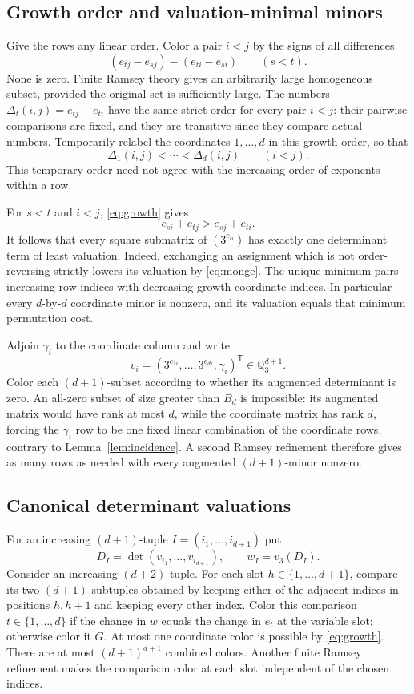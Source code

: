 \documentclass[11pt]{article}
\theoremstyle{definition}
\theoremstyle{remark}
\newcommand{\Q}{\mathbb Q}
\newcommand{\val}{v_3}
\begin{document}
\subsection{Growth order and valuation-minimal minors}
Give the rows any linear order. Color a pair $i<j$ by the signs of all
differences
\[
 (e_{tj}-e_{sj})-(e_{ti}-e_{si})\qquad(s<t).
\]
None is zero. Finite Ramsey theory gives an arbitrarily large
homogeneous subset, provided the original set is sufficiently large.
The numbers
$\Delta_t(i,j)=e_{tj}-e_{ti}$ have the same strict order for every
pair $i<j$: their pairwise comparisons are fixed, and they are
transitive since they compare actual numbers. Temporarily relabel the
coordinates $1,\ldots,d$ in this growth order, so that
\begin{equation}\label{eq:growth}
 \Delta_1(i,j)<\cdots<\Delta_d(i,j)\qquad(i<j).
\end{equation}
This temporary order need not agree with the increasing order of
exponents within a row.

For $s<t$ and $i<j$, \eqref{eq:growth} gives
\begin{equation}\label{eq:monge}
 e_{si}+e_{tj}>e_{sj}+e_{ti}.
\end{equation}
It follows that every square submatrix of $(3^{e_{ti}})$ has exactly
one determinant term of least valuation. Indeed, exchanging an
assignment which is not order-reversing strictly lowers its valuation
by \eqref{eq:monge}. The unique minimum pairs increasing row indices
with decreasing growth-coordinate indices. In particular every
$d$-by-$d$ coordinate minor is nonzero, and its valuation equals that
minimum permutation cost.

Adjoin $\gamma_i$ to the coordinate column and write
\[
 v_i=(3^{e_{1i}},\ldots,3^{e_{di}},\gamma_i)^{\mathsf T}
 \in\Q_3^{d+1}.
\]
Color each $(d+1)$-subset according to whether its augmented determinant
is zero. An all-zero subset of size greater than $B_d$ is impossible:
its augmented matrix would have rank at most $d$, while the coordinate
matrix has rank $d$, forcing the $\gamma_i$ row to be one fixed linear
combination of the coordinate rows, contrary to
Lemma~\ref{lem:incidence}. A second Ramsey refinement therefore gives
as many rows as needed with every augmented $(d+1)$-minor nonzero.

\subsection{Canonical determinant valuations}
For an increasing $(d+1)$-tuple $I=(i_1,\ldots,i_{d+1})$ put
\[
 D_I=\det(v_{i_1},\ldots,v_{i_{d+1}}),\qquad w_I=\val(D_I).
\]
Consider an increasing $(d+2)$-tuple. For each slot
$h\in\{1,\ldots,d+1\}$, compare its two $(d+1)$-subtuples obtained
by keeping either of the adjacent indices in positions $h,h+1$ and
keeping every other index. Color this comparison $t\in\{1,\ldots,d\}$
if the change in $w$ equals the change in $e_t$ at the variable slot;
otherwise color it $G$. At most one coordinate color is possible by
\eqref{eq:growth}. There are at most $(d+1)^{d+1}$ combined colors.
Another finite Ramsey refinement makes the comparison color at each
slot independent of the chosen indices.
\end{document}
